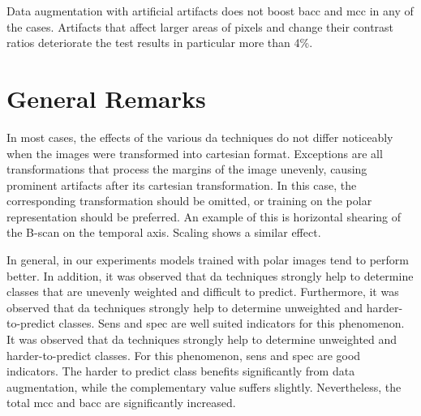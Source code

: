 Data augmentation with artificial artifacts does not boost bacc and mcc in any of the cases. Artifacts that affect larger areas of pixels and change their contrast ratios deteriorate the test results in particular more than 4\%.


\section{General Remarks}

In most cases, the effects of the various \acrshort{da} techniques do not differ noticeably when the images were transformed into cartesian format. Exceptions are all transformations that process the margins of the image unevenly, causing prominent artifacts after its cartesian transformation. In this case, the corresponding transformation should be omitted, or training on the polar representation should be preferred. An example of this is horizontal shearing of the B-scan on the temporal axis. Scaling shows a similar effect.

In general, in our experiments models trained with polar images tend to perform better. In addition, it was observed that \acrshort{da} techniques strongly help to determine classes that are unevenly weighted and difficult to predict. Furthermore, it was observed that \acrshort{da} techniques strongly help to determine unweighted and harder-to-predict classes. Sens and spec are well suited indicators for this phenomenon. It was observed that \acrshort{da} techniques strongly help to determine unweighted and harder-to-predict classes. For this phenomenon, \acrshort{sens} and \acrshort{spec} are good indicators. The harder to predict class benefits significantly from data augmentation, while the complementary value suffers slightly. Nevertheless, the total \acrshort{mcc} and \acrshort{bacc} are significantly increased.
